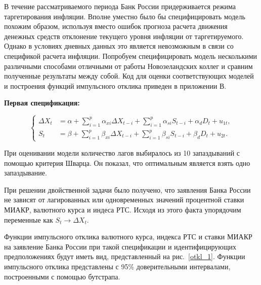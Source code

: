 \documentclass[14pt,a4paper, oneside]{extreport}
\def \a{\alpha}
\def \b{\beta}
\def \Dt{\Delta}
\theoremstyle{plain}              %
\theoremstyle{definition}         %
\begin{document}
В течение рассматриваемого периода Банк России придерживается режима таргетирования инфляции. Вполне уместно было бы специфицировать модель похожим образом, используя вместо ошибок прогноза расчета движения денежных средств отклонение текущего уровня инфляции от таргетируемого. Однако в условиях дневных данных это является невозможным в связи со спецификой расчета инфляции. Попробуем специфицировать модель несколькими различными способами отличными от работы Новозеландских коллег и сравним полученные результаты между собой. Код для оценки соответствующих моделей и построения функций импульсного отклика приведен в приложении В.

\textbf{Первая спецификация:}

\begin{equation}
\left\{
\begin{aligned}
\Dt X_t &= \a + \sum_{i=1}^p \a_{xi} \Dt X_{t-i} + \sum_{i=1}^p \a_{si} S_{t-i} +\a_d D_t +  u_{1t}, \\
S_t &= \b + \sum_{i=1}^p \b_{xi} \Dt X_{t-i} + \sum_{i=1}^p \b_{si} S_{t-i} + \b_d D_t +  u_{2t}.
\end{aligned}
\right.
\end{equation}
 
При оценивании модели количество лагов выбиралось из 10 запаздываний с помощью критерия Шварца. Он показал, что оптимальным является взять одно запаздывание. 

При решении двойственной задачи было получено, что заявления Банка России не зависят от лагированных или одновременных значений процентной ставки МИАКР, валютного курса и индеса РТС. Исходя из этого факта упорядочим переменные как $S_t \to \Dt X_t$.

Функции импульсного отклика валютного курса, индекса РТС и ставки МИАКР на заявление Банка России при такой спецификации и идентифицирующих предположениях будут иметь вид, представленный на рис.~\ref{otkl_1}. Функции импульсного отклика представлены с 95\% доверительными интервалами, построенными с помощью бутстрапа.
\end{document}
